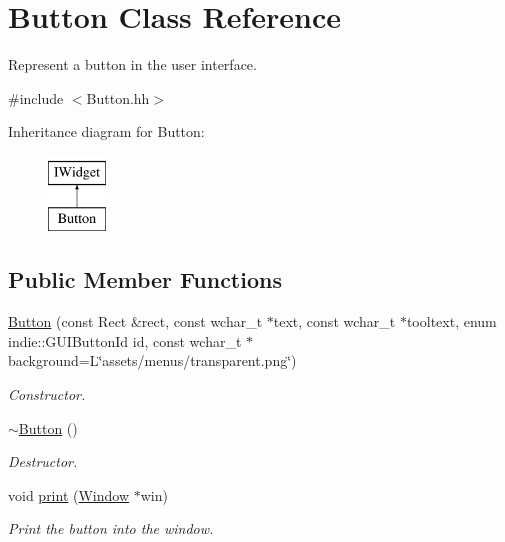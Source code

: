 \hypertarget{classButton}{}\section{Button Class Reference}
\label{classButton}


Represent a button in the user interface.  




{\ttfamily \#include $<$Button.\+hh$>$}

Inheritance diagram for Button\+:\begin{figure}[H]
\begin{center}
\leavevmode
\includegraphics[height=2.000000cm]{classButton}
\end{center}
\end{figure}
\subsection*{Public Member Functions}
\begin{DoxyCompactItemize}
\item 
\hyperlink{classButton_a5729094ff8ec4ce3e64e6691c297983c}{Button} (const Rect \&rect, const wchar\+\_\+t $\ast$text, const wchar\+\_\+t $\ast$tooltext, enum indie\+::\+G\+U\+I\+Button\+Id id, const wchar\+\_\+t $\ast$background=L\char`\"{}assets/menus/transparent.\+png\char`\"{})
\begin{DoxyCompactList}\small\item\em Constructor. \end{DoxyCompactList}\item 
\mbox{\label{classButton_a2a001eb9c3cc8ae54768a850dd345002}} 
\hyperlink{classButton_a2a001eb9c3cc8ae54768a850dd345002}{$\sim$\+Button} ()
\begin{DoxyCompactList}\small\item\em Destructor. \end{DoxyCompactList}\item 
void \hyperlink{classButton_aaee0c62414711ae91084b05b38d0c8c5}{print} (\hyperlink{classWindow}{Window} $\ast$win)
\begin{DoxyCompactList}\small\item\em Print the button into the window. \end{DoxyCompactList}\end{DoxyCompactItemize}


